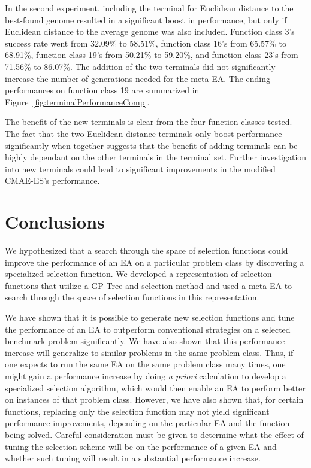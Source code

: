 \documentclass[sigconf]{acmart}
\begin{document}
In the second experiment, including the terminal for Euclidean distance to the best-found genome resulted in a significant boost in performance, but only if Euclidean distance to the average genome was also included. Function class 3's success rate went from 32.09\% to 58.51\%, function class 16's from 65.57\% to 68.91\%, function class 19's from 50.21\% to 59.20\%, and function class 23's from 71.56\% to 86.07\%. The addition of the two terminals did not significantly increase the number of generations needed for the meta-EA. The ending performances on function class 19 are summarized in Figure~\ref{fig:terminalPerformanceComp}.

The benefit of the new terminals is clear from the four function classes tested. The fact that the two Euclidean distance terminals only boost performance significantly when together suggests that the benefit of adding terminals can be highly dependant on the other terminals in the terminal set. Further investigation into new terminals could lead to significant improvements in the modified CMAE-ES's performance.

\section{Conclusions}
\label{Conclusion}
We hypothesized that a search through the space of selection functions could improve the performance of an EA on a particular problem class by discovering a specialized selection function. We developed a representation of selection functions that utilize a GP-Tree and selection method and used a meta-EA to search through the space of selection functions in this representation. 

We have shown that it is possible to generate new selection functions and tune the performance of an EA to outperform conventional strategies on a selected benchmark problem significantly. We have also shown that this performance increase will generalize to similar problems in the same problem class. Thus, if one expects to run the same EA on the same problem class many times, one might gain a performance increase by doing \textit{a priori} calculation to develop a specialized selection algorithm, which would then enable an EA to perform better on instances of that problem class. However, we have also shown that, for certain functions, replacing only the selection function may not yield significant performance improvements, depending on the particular EA and the function being solved. Careful consideration must be given to determine what the effect of tuning the selection scheme will be on the performance of a given EA and whether such tuning will result in a substantial performance increase. 



\end{document}
